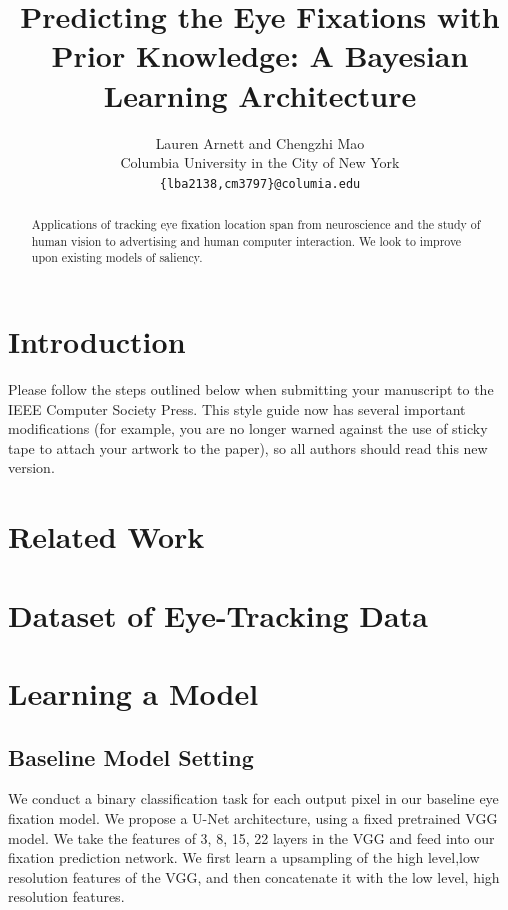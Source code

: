 \documentclass[10pt,twocolumn,letterpaper]{article}
\begin{document}
\title{Predicting the Eye Fixations with Prior Knowledge: A Bayesian Learning Architecture}

\author{Lauren Arnett and Chengzhi Mao\\
Columbia University in the City of New York\\
    {\tt\small \{lba2138,cm3797\}@columia.edu}
}

\maketitle

\begin{abstract}
   Applications of tracking eye fixation location span from neuroscience and
   the study of human vision to advertising and human computer interaction. 
   We look to improve upon existing models of saliency. 

\end{abstract}

\section{Introduction}

Please follow the steps outlined below when submitting your manuscript to
the IEEE Computer Society Press.  This style guide now has several
important modifications (for example, you are no longer warned against the
use of sticky tape to attach your artwork to the paper), so all authors
should read this new version.

\section{Related Work}

\section{Dataset of Eye-Tracking Data}
\section{Learning a Model}
\subsection{Baseline Model Setting}
We conduct a binary classification task for each output pixel in our baseline eye fixation model. We propose a U-Net architecture, using a fixed pretrained VGG model. We take the features of 3, 8, 15, 22 layers in the VGG and feed into our fixation prediction network. We first learn a upsampling of the high level,low resolution features of the VGG, and then concatenate it with the low level, high resolution features.
\end{document}
